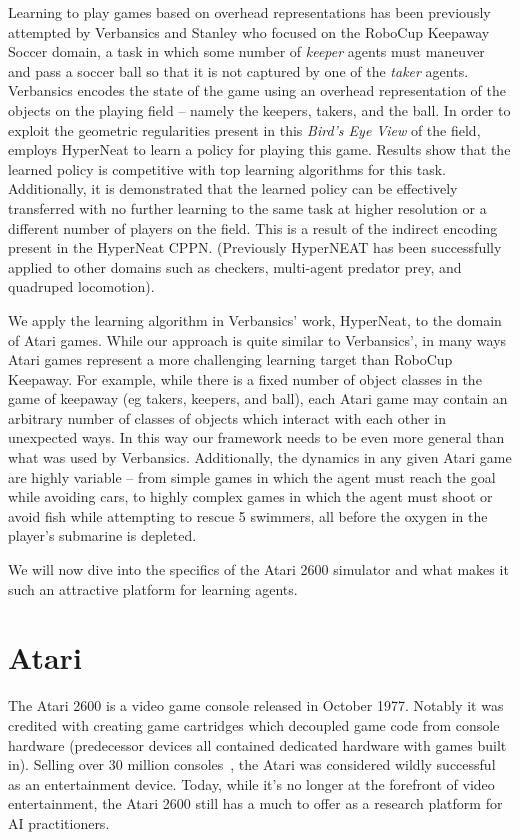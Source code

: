 \documentclass{acm_proc_article-sp}
\begin{document}
Learning to play games based on overhead representations has been previously attempted by Verbansics and Stanley\cite{verbancsics10} who focused on the RoboCup Keepaway Soccer domain\cite{stone01}, a task in which some number of \textit{keeper} agents must maneuver and pass a soccer ball so that it is not captured by one of the \textit{taker} agents. Verbansics encodes the state of the game using an overhead representation of the objects on the playing field -- namely the keepers, takers, and the ball. In order to exploit the geometric regularities present in this \textit{Bird's Eye View} of the field, employs HyperNeat to learn a policy for playing this game. Results show that the learned policy is competitive with top learning algorithms for this task. Additionally, it is demonstrated that the learned policy can be effectively transferred with no further learning to the same task at higher resolution or a different number of players on the field. This is a result of the indirect encoding present in the HyperNeat CPPN. (Previously HyperNEAT has been successfully applied to other domains such as checkers\cite{gauci08}, multi-agent predator prey\cite{ambrosio08}, and quadruped locomotion\cite{clune09}). 

We apply the learning algorithm in Verbansics' work, HyperNeat, to the domain of Atari games. While our approach is quite similar to Verbansics', in many ways Atari games represent a more challenging learning target than RoboCup Keepaway. For example, while there is a fixed number of object classes in the game of keepaway (eg takers, keepers, and ball), each Atari game may contain an arbitrary number of classes of objects which interact with each other in unexpected ways. In this way our framework needs to be even more general than what was used by Verbansics. Additionally, the dynamics in any given Atari game are highly variable -- from simple games in which the agent must reach the goal while avoiding cars, to highly complex games in which the agent must shoot or avoid fish while attempting to rescue 5 swimmers, all before the oxygen in the player's submarine is depleted.

We will now dive into the specifics of the Atari 2600 simulator and what makes it such an attractive platform for learning agents.

\section{Atari}
\label{sec:atari}
The Atari 2600 is a video game console released in October 1977. Notably it was credited with creating game cartridges which decoupled game code from console hardware (predecessor devices all contained dedicated hardware with games built in). Selling over 30 million consoles~\cite{atarihist}, the Atari was considered wildly successful as an entertainment device. Today, while it's no longer at the forefront of video entertainment, the Atari 2600 still has a much to offer as a research platform for AI practitioners. 
\end{document}
